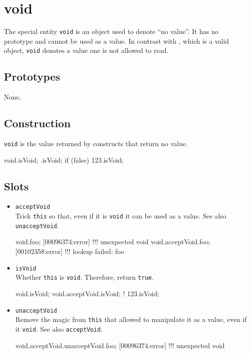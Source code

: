 \section{void}

The special entity \lstinline|void| is an object used to denote ``no
value''.  It has no prototype and cannot be used as a value.  In
contrast with , which is a valid object,
\lstinline|void| denotes a value one is not allowed to read.

\subsection{Prototypes}

None.

\subsection{Construction}

\lstinline|void| is the value returned by constructs that return no
value.

\begin{urbiassert}[firstnumber=1]
void.isVoid;
{}.isVoid;
{if (false) 123}.isVoid;
\end{urbiassert}

\subsection{Slots}

\begin{itemize}
\item \lstinline|acceptVoid|\\
  Trick \lstinline|this| so that, even if it is \lstinline|void| it
  can be used as a value.  See also \lstinline|unacceptVoid|.
\begin{urbiscript}[firstnumber=last]
void.foo;
[00096374:error] !!! unexpected void
void.acceptVoid.foo;
[00102358:error] !!! lookup failed: foo
\end{urbiscript}

\item \lstinline|isVoid|\\
  Whether \lstinline|this| is \lstinline|void|.  Therefore, return
  \lstinline|true|.
\begin{urbiassert}[firstnumber=last]
void.isVoid;
void.acceptVoid.isVoid;
! 123.isVoid;
\end{urbiassert}

\item \lstinline|unacceptVoid|\\
  Remove the magic from \lstinline|this| that allowed to manipulate it
  as a value, even if it \lstinline|void|.  See also
  \lstinline|acceptVoid|.
\begin{urbiscript}[firstnumber=last]
void.acceptVoid.unacceptVoid.foo;
[00096374:error] !!! unexpected void
\end{urbiscript}

\end{itemize}




